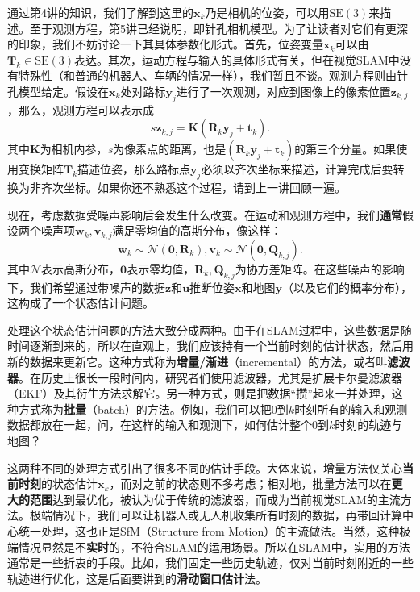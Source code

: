 通过第4讲的知识，我们了解到这里的$\bm{x}_k$乃是相机的位姿，可以用$\mathrm{SE}(3)$来描述。至于观测方程，第5讲已经说明，即针孔相机模型。为了让读者对它们有更深的印象，我们不妨讨论一下其具体参数化形式。首先，位姿变量$\bm{x}_k$可以由$\bm{T}_k \in \mathrm{SE}(3) $表达。其次，运动方程与输入的具体形式有关，但在视觉SLAM中没有特殊性（和普通的机器人、车辆的情况一样），我们暂且不谈。观测方程则由针孔模型给定。假设在$\bm{x}_k$处对路标$\bm{y}_j$进行了一次观测，对应到图像上的像素位置$\bm{z}_{k,j}$，那么，观测方程可以表示成
\begin{equation}
s \bm{z}_{k,j}= \bm{K} (\bm{R}_k {\bm{y}_j}+\bm{t}_k).
\end{equation}
其中$\bm{K}$为相机内参，$s$为像素点的距离，也是$(\bm{R}_k {\bm{y}_j}+\bm{t}_k)$的第三个分量。如果使用变换矩阵$\bm{T}_k$描述位姿，那么路标点$\bm{y}_j$必须以齐次坐标来描述，计算完成后要转换为非齐次坐标。如果你还不熟悉这个过程，请到上一讲回顾一遍。

现在，考虑数据受噪声影响后会发生什么改变。在运动和观测方程中，我们\textbf{通常}假设两个噪声项$\bm{w}_k, \bm{v}_{k,j}$满足零均值的高斯分布，像这样：
\begin{equation}
{\bm{w}_k} \sim \mathcal{N}\left( {\bm{0},{\bm{R}_k}} \right),{\bm{v}_k} \sim \mathcal{N}\left( {\bm{0},{{{\bm{Q}}}_{k,j}}} \right).
\end{equation}
其中$\mathcal{N}$表示高斯分布，$\bm{0}$表示零均值，$\bm{R}_k, \bm{Q}_{k,j}$为协方差矩阵。在这些噪声的影响下，我们希望通过带噪声的数据$\bm{z}$和$\bm{u}$推断位姿$\bm{x}$和地图$\bm{y}$（以及它们的概率分布），这构成了一个状态估计问题。

处理这个状态估计问题的方法大致分成两种。由于在SLAM过程中，这些数据是随时间逐渐到来的，所以在直观上，我们应该持有一个当前时刻的估计状态，然后用新的数据来更新它。这种方式称为\textbf{增量/渐进}（incremental）的方法，或者叫\textbf{滤波器}。在历史上很长一段时间内，研究者们使用滤波器，尤其是扩展卡尔曼滤波器（EKF）及其衍生方法求解它。另一种方式，则是把数据“攒”起来一并处理，这种方式称为\textbf{批量}（batch）的方法。例如，我们可以把0到$k$时刻所有的输入和观测数据都放在一起，问，在这样的输入和观测下，如何估计整个0到$k$时刻的轨迹与地图？

这两种不同的处理方式引出了很多不同的估计手段。大体来说，增量方法仅关心\textbf{当前时刻}的状态估计$\bm{x}_k$，而对之前的状态则不多考虑；相对地，批量方法可以在\textbf{更大的范围}达到最优化，被认为优于传统的滤波器\textsuperscript{\cite{Strasdat2012}}，而成为当前视觉SLAM的主流方法。极端情况下，我们可以让机器人或无人机收集所有时刻的数据，再带回计算中心统一处理，这也正是SfM（Structure from Motion）的主流做法。当然，这种极端情况显然是不\textbf{实时}的，不符合SLAM的运用场景。所以在SLAM中，实用的方法通常是一些折衷的手段。比如，我们固定一些历史轨迹，仅对当前时刻附近的一些轨迹进行优化，这是后面要讲到的\textbf{滑动窗口估计}法。

